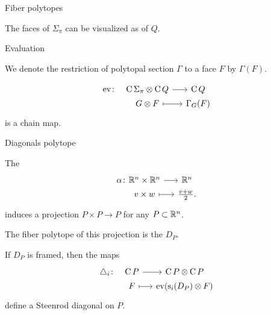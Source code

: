 \begin{frame}[fragile]{Fiber polytopes}
\begin{minipage}{.45\textwidth}
\begin{center}
		\end{center}
	\end{minipage}

	\bigskip\medskip The faces of $\Sigma_\pi$ can be visualized as  of $Q$.
\end{frame}

\begin{frame}[fragile]{Evaluation}
	\pause
	
	We denote the restriction of polytopal section $\Gamma$ to a face $F$ by $\Gamma(F)$.
	
	\pause\medskip{}
	\[
	\begin{tikzcd}[column sep=small, row sep=0]
		\mathrm{ev} \colon &[-10pt] \chains \Sigma_\pi \ot \chains Q \rar & \chains Q \\
		& G \ot F \rar[maps to] & \Gamma_G(F)
	\end{tikzcd}
	\]
	is a chain map.
\end{frame}

\begin{frame}[fragile]{Diagonals polytope}
	\pause
	
	The 
	\[
	\begin{tikzcd}[column sep=small, row sep=0]
		\alpha \colon &[-20pt] \R^n \times \R^n \rar & \R^n \\
		& v \times w \rar[mapsto]& \frac{v+w}{2}.
	\end{tikzcd}
	\]
	induces a projection $P \times P \to P$ for any $P \subset \mathbb{R}^n$.
	
	\pause\bigskip
	The fiber polytope of this projection is the  $D_P$.
		
	\pause\bigskip
	 If $D_P$ is framed, then the maps
	\[
	\begin{tikzcd}[column sep=small, row sep=0]
		\triangle_i \colon &[-10pt] \chains P \rar & \chains P \ot \chains P \\
		& F \rar[maps to] & \mathrm{ev}(\so_i(D_P) \ot F)\\
	\end{tikzcd}
	\]
	define a Steenrod diagonal on $P$.
\end{frame}

